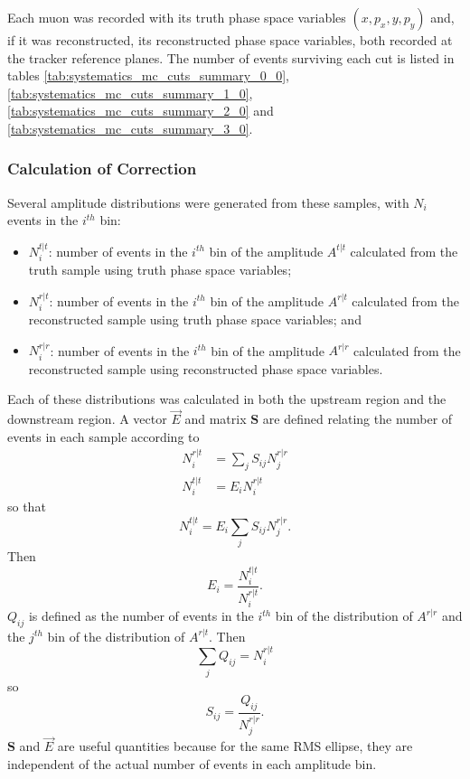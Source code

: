 Each muon was recorded with its truth phase space variables $(x, p_x, y, p_y)$ 
and, if it was reconstructed, its reconstructed phase space variables, both
recorded at the tracker reference planes. The number of events surviving each 
cut is listed in tables \ref{tab:systematics_mc_cuts_summary_0_0},
\ref{tab:systematics_mc_cuts_summary_1_0},
\ref{tab:systematics_mc_cuts_summary_2_0} and
 \ref{tab:systematics_mc_cuts_summary_3_0}.

\let\splitcell\undefined

\let\splitcell\undefined

\let\splitcell\undefined

\let\splitcell\undefined

\let\splitcell\undefined

\subsubsection{Calculation of Correction}
Several amplitude distributions were generated from these samples, with $N_i$
events in the $i^{th}$ bin:
\begin{itemize}
\item $N_i^{t|t}$: number of events in the $i^{th}$ bin of the amplitude 
$A^{t|t}$ calculated from the truth sample using truth phase space variables;
\item $N_i^{r|t}$: number of events in the $i^{th}$ bin of the amplitude 
$A^{r|t}$ calculated from  the reconstructed sample using truth phase space 
variables; and
\item $N_i^{r|r}$: number of events in the $i^{th}$ bin of the amplitude 
$A^{r|r}$  calculated from the reconstructed sample using reconstructed phase 
space variables.
\end{itemize}
Each of these distributions was calculated in both the upstream region and the 
downstream region. A vector $\vec{E}$ and matrix $\mathbf{S}$ are defined relating 
the number of events in each sample according to
\begin{align}
N_i^{r|t} &= \sum_j S_{ij} N_j^{r|r} \\
N_i^{t|t} &=  E_{i} N_i^{r|t}
\end{align}
so that
\begin{equation}
N_i^{t|t} = E_{i} \sum_j S_{ij} N_{j}^{r|r}.
\end{equation}
Then
\begin{equation}
\label{eq:efficiency}
E_i = \frac{N_i^{t|t}}{N_i^{r|t}}.
\end{equation}
$Q_{ij}$ is defined as the number of events in the $i^{th}$ bin of the 
distribution of $A^{r|r}$ and the $j^{th}$ bin of the distribution of $A^{r|t}$.
Then
\begin{equation}
\sum_j Q_{ij} = N_i^{r|t}
\end{equation}
so
\begin{equation}
S_{ij}  = \frac{Q_{ij}}{N_j^{r|r}}.
\end{equation}
$\mathbf{S}$ and $\vec{E}$ are useful quantities because for the same 
RMS ellipse, they are independent of the actual number of events in
each amplitude bin.

